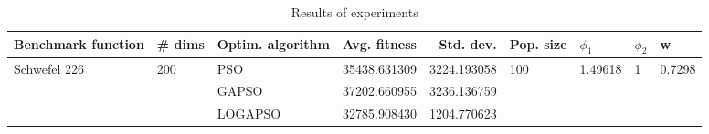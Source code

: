 \begin{table}
\centering
\caption{Results of experiments}
\begin{tabular}{lllrrllll}
\toprule
           Benchmark function &              \# dims & Optim. algorithm &  Avg. fitness &   Std. dev. &            Pop. size &               $\phi_{1}$ &         $\phi_{2}$ &                       w \\
\midrule
\multirow{3}{*}{Schwefel 226} & \multirow{3}{*}{200} &              PSO &  35438.631309 & 3224.193058 & \multirow{3}{*}{100} & \multirow{3}{*}{1.49618} & \multirow{3}{*}{1} & \multirow{3}{*}{0.7298} \\
                              &                      &            GAPSO &  37202.660955 & 3236.136759 &                      &                          &                    &                         \\
                              &                      &          LOGAPSO &  32785.908430 & 1204.770623 &                      &                          &                    &                         \\
\bottomrule
\end{tabular}
\end{table}
